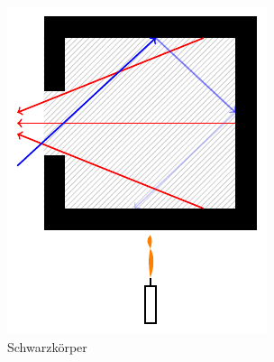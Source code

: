 %
%
%
\begin{figure}
\centering
\includegraphics{papers/fourier/images/Schwarzkoerper.pdf}
\caption{Schwarzkörper%
\label{fourier:fig:schwarzkoerper}}
\end{figure}